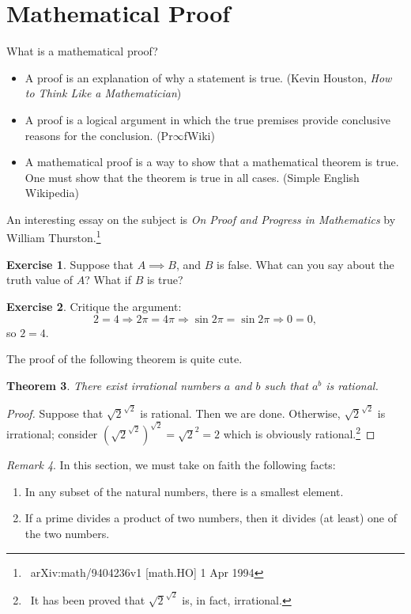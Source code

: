 \documentclass[a4paper]{amsart}
\newtheorem{thm}{Theorem}[section]
\theoremstyle{definition}
\newtheorem{exercise}[thm]{Exercise}
\theoremstyle{remark}
\newtheorem{rem}[thm]{Remark}
\begin{document}
\section{Mathematical Proof}
What is a mathematical proof?
\begin{itemize}
  \item A proof is an explanation of why a statement is true. (Kevin Houston, \textit{How to Think Like a Mathematician})
  \item A proof is a logical argument in which the true premises provide conclusive reasons for the conclusion. (Pr$\infty$fWiki)
  \item A mathematical proof is a way to show that a mathematical theorem is true. One must show that the theorem is true in all cases. (Simple English Wikipedia)
\end{itemize}

An interesting essay on the subject is \textit{On Proof and Progress in Mathematics} by William Thurston.\footnote{~arXiv:math/9404236v1 [math.HO] 1 Apr 1994}

\begin{exercise}
  Suppose that $ A \implies B $, and $ B $ is false. What can you say about the truth value of $ A $? What if $ B $ is true?
\end{exercise}

\begin{exercise}
  Critique the argument:
  \begin{displaymath}
    2 = 4 \Rightarrow 2\pi = 4\pi \Rightarrow \sin 2\pi = \sin 2\pi \Rightarrow 0 = 0,
  \end{displaymath}
  so $ 2 = 4 $.
\end{exercise}

The proof of the following theorem is quite cute.

\begin{thm}
  There exist irrational numbers $ a $ and $ b $ such that $ a^b $ is rational.
\end{thm}
\begin{proof}
  Suppose that $ \sqrt{2}^{\sqrt{2}} $ is rational. Then we are done. Otherwise, $ \sqrt{2}^{\sqrt{2}} $ is irrational;
  consider $ (\sqrt{2}^{\sqrt{2}})^{\sqrt{2}} = \sqrt{2}^2 = 2 $ which is obviously rational.\footnote{~It has been proved
  that $ \sqrt{2}^{\sqrt{2}} $ is, in fact, irrational.}
\end{proof}

\begin{rem}
  In this section, we must take on faith the following facts:
  \begin{enumerate}
    \item In any subset of the natural numbers, there is a smallest element.
    \item If a prime divides a product of two numbers, then it divides (at least) one of the two numbers.
  \end{enumerate}
\end{rem}
\end{document}
